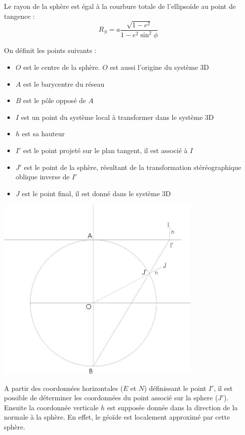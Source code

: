 \documentclass[french]{report}
\begin{document}
Le rayon de la sphère est égal à la courbure totale de l'ellipsoïde au point de tangence :
$$R_S = a \frac{ \sqrt {1-e^2} }{1-e^2 \sin ^2 {\phi} }$$




On définit les points suivants :
\begin{itemize}
\item $O$ est le centre de la sphère. $O$ est aussi l'origine du système 3D
\item $A$ est le barycentre du réseau
\item $B$ est le pôle opposé de $A$
\item $I$ est un point du système local à transformer dans le système 3D
\item $h$ est sa hauteur
\item $I'$ est le point projeté sur le plan tangent, il est associé à $I$
\item $J'$ est le point de la sphère, résultant de la transformation stéréographique oblique inverse de $I'$
\item $J$ est le point final, il est donné dans le système 3D
\end{itemize}

\begin{center}
\includegraphics[width = 10cm]{images/coupe}
\end{center}

A partir des coordonnées horizontales ($E$ et $N$) définissant le point $I'$, il est possible de déterminer
les coordonnées du point associé sur la sphere ($J'$).
Ensuite la coordonnée verticale $h$ est supposée donnée dans la direction de la normale à la sphère.
En effet, le géoïde est localement approximé par cette sphère.
\end{document}
